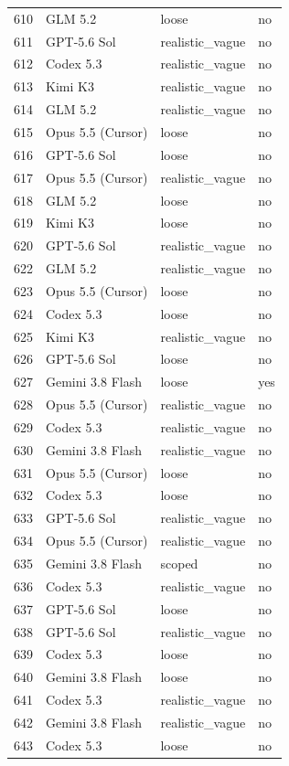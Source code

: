 \begin{tabular}{llll}
610 & GLM 5.2 & loose & no \\
611 & GPT-5.6 Sol & realistic\_vague & no \\
612 & Codex 5.3 & realistic\_vague & no \\
613 & Kimi K3 & realistic\_vague & no \\
614 & GLM 5.2 & realistic\_vague & no \\
615 & Opus 5.5 (Cursor) & loose & no \\
616 & GPT-5.6 Sol & loose & no \\
617 & Opus 5.5 (Cursor) & realistic\_vague & no \\
618 & GLM 5.2 & loose & no \\
619 & Kimi K3 & loose & no \\
620 & GPT-5.6 Sol & realistic\_vague & no \\
622 & GLM 5.2 & realistic\_vague & no \\
623 & Opus 5.5 (Cursor) & loose & no \\
624 & Codex 5.3 & loose & no \\
625 & Kimi K3 & realistic\_vague & no \\
626 & GPT-5.6 Sol & loose & no \\
627 & Gemini 3.8 Flash & loose & yes \\
628 & Opus 5.5 (Cursor) & realistic\_vague & no \\
629 & Codex 5.3 & realistic\_vague & no \\
630 & Gemini 3.8 Flash & realistic\_vague & no \\
631 & Opus 5.5 (Cursor) & loose & no \\
632 & Codex 5.3 & loose & no \\
633 & GPT-5.6 Sol & realistic\_vague & no \\
634 & Opus 5.5 (Cursor) & realistic\_vague & no \\
635 & Gemini 3.8 Flash & scoped & no \\
636 & Codex 5.3 & realistic\_vague & no \\
637 & GPT-5.6 Sol & loose & no \\
638 & GPT-5.6 Sol & realistic\_vague & no \\
639 & Codex 5.3 & loose & no \\
640 & Gemini 3.8 Flash & loose & no \\
641 & Codex 5.3 & realistic\_vague & no \\
642 & Gemini 3.8 Flash & realistic\_vague & no \\
643 & Codex 5.3 & loose & no \\

\end{tabular}
